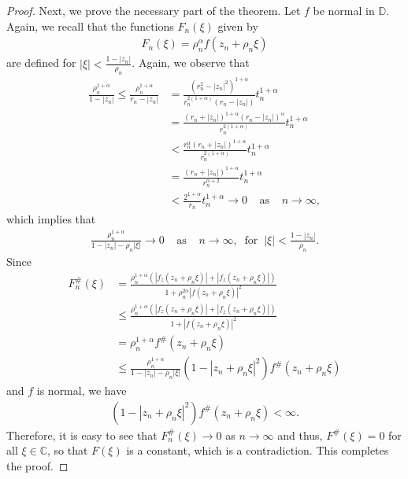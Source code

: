 \documentclass[10pt,a4paper]{amsart}
\begin{document}
\begin{proof}
Next, we prove the necessary part of the theorem. Let $f$ be normal in $\mathbb{D}$. Again, we recall that the functions $F_n(\xi)$ given by
\begin{align*}
	F_n(\xi)=\rho^{\alpha}_n f(z_n+\rho_n\xi)
\end{align*}
are defined for $|\xi|<\frac{1-|z_n|}{\rho_n}$. Again, we observe that
\begin{align*}
	\frac{\rho^{1+\alpha}_n}{1-|z_n|}\leq \frac{\rho^{1+\alpha}_n}{r_n -|z_n|}&= \frac{(r^2_n -|z_n|^2)^{1+\alpha}}{r^{2(1+\alpha)}_n(r_n -|z_n|)}t^{1+\alpha}_n \\&= \frac{(r_n +|z_n|)^{1+\alpha}(r_n -|z_n|)^{\alpha}}{r^{2(1+\alpha)}_n} t^{1+\alpha}_n \\&< \frac{r^{\alpha}_n(r_n +|z_n|)^{1+\alpha}}{r^{2(1+\alpha)}_n} t^{1+\alpha}_n \\&= \frac{(r_n +|z_n|)^{1+\alpha}}{r^{\alpha +2}_n} t^{1+\alpha}_n \\&< \frac{2^{1+\alpha}}{r_n} t^{1+\alpha}_n \rightarrow 0 \;\;\;\;\mbox{as} \;\;\;\;n\rightarrow \infty,
\end{align*}
which implies that
\begin{align*}
	\frac{\rho^{1+\alpha}_n}{1-|z_n|-\rho_n |\xi|}\rightarrow 0 \;\;\;\;\mbox{as} \;\;\;\;n\rightarrow \infty,\;\;\mbox{for}\;\; |\xi|<\frac{1-|z_n|}{\rho_n}.
\end{align*}
Since
\begin{align*}
	F^{\#}_n(\xi)&= \frac{\rho^{1+\alpha}_n\left(|f_z(z_n+\rho_n\xi)| + |f_{\overline{z}}(z_n+\rho_n\xi)|\right)}{1+\rho^{2\alpha}_n |f(z_n+\rho_n\xi)|^2} \\&\leq \frac{\rho^{1+\alpha}_n \left(|f_z(z_n+\rho_n\xi)| + |f_{\overline{z}}(z_n+ \rho_n\xi)| \right)}{1+ |f(z_n+\rho_n\xi)|^2} \\&= \rho^{1+ \alpha}_n f^{\#}(z_n+\rho_n\xi)\\&\leq \frac{\rho^{1+\alpha}_n} {1-|z_n|-\rho_n |\xi|} \left(1 -|z_n+\rho_n\xi|^2\right) f^{\#}(z_n+\rho_n\xi)
\end{align*}
and $f$ is normal, we have
\begin{align*}
	\left(1 -|z_n+\rho_n\xi|^2\right) f^{\#}(z_n+\rho_n\xi)<\infty.
\end{align*}
Therefore, it is easy to see that $F^{\#}_n(\xi)\rightarrow 0$ as $n\rightarrow\infty$ and thus, $F^{\#}(\xi)=0$ for all $\xi\in \mathbb{C}$, so that $F(\xi)$ is a constant, which is a contradiction. This completes the proof.
\end{proof}
\end{document}
